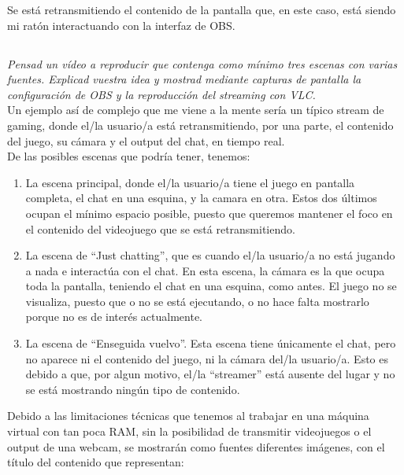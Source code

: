 \documentclass[spanish]{article}
\begin{document}
Se está retransmitiendo el contenido de la pantalla que, en
este caso, está siendo mi ratón interactuando con la
interfaz de OBS.

\subsection{}

\textit{Pensad un vídeo a reproducir que contenga como
mínimo tres escenas con varias fuentes. Explicad vuestra
idea y mostrad mediante capturas de pantalla la
configuración de OBS y la reproducción del streaming con
VLC.}\\

Un ejemplo así de complejo que me viene a la mente sería un
típico stream de gaming, donde el/la usuario/a está
retransmitiendo, por una parte, el contenido del juego, su
cámara y el output del chat, en tiempo real.\\

De las posibles escenas que podría tener, tenemos:

\begin{enumerate}
\item La escena principal, donde el/la usuario/a tiene el
juego en pantalla completa, el chat en una esquina, y la
camara en otra. Estos dos últimos ocupan el mínimo espacio
posible, puesto que queremos mantener el foco en el
contenido del videojuego que se está retransmitiendo.
\item La escena de ``Just chatting'', que es cuando el/la
usuario/a no está jugando a nada e interactúa con el chat.
En esta escena, la cámara es la que ocupa toda la pantalla,
teniendo el chat en una esquina, como antes. El juego no se
visualiza, puesto que o no se está ejecutando, o no hace
falta mostrarlo porque no es de interés actualmente.
\item La escena de ``Enseguida vuelvo''. Esta escena tiene
únicamente el chat, pero no aparece ni el contenido del
juego, ni la cámara del/la usuario/a. Esto es debido a que,
por algun motivo, el/la ``streamer'' está ausente del lugar
y no se está mostrando ningún tipo de contenido.
\end{enumerate}

Debido a las limitaciones técnicas que tenemos al trabajar
en una máquina virtual con tan poca RAM, sin la posibilidad
de transmitir videojuegos o el output de una webcam, se
mostrarán como fuentes diferentes imágenes, con el título
del contenido que representan:

\newpage
\end{document}
